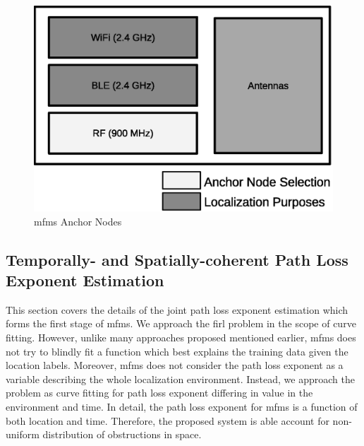     \begin{figure}[thpb]
       \centering
       \includegraphics[width=\linewidth]{figures/mfms_module.eps}
       \caption{\label{fig:module}\gls{mfms} Anchor Nodes}
    \end{figure}

    \subsection{Temporally- and Spatially-coherent Path Loss Exponent Estimation}
    This section covers the details of the joint path loss exponent estimation  which forms the first stage of \gls{mfms}.
    We approach the \gls{firl} problem in the scope of curve fitting.
    However, unlike many approaches proposed mentioned earlier, \gls{mfms} does not try to blindly fit a function which best explains the training data given the location labels.
    Moreover, \gls{mfms} does not consider the path loss exponent as a variable describing the whole localization environment.
    Instead, we approach the problem as curve fitting for path loss exponent differing in value in the environment and time.
    In detail, the path loss exponent for \gls{mfms} is a function of both location and time.
    Therefore, the proposed system is able account for non-uniform distribution of obstructions in space.

